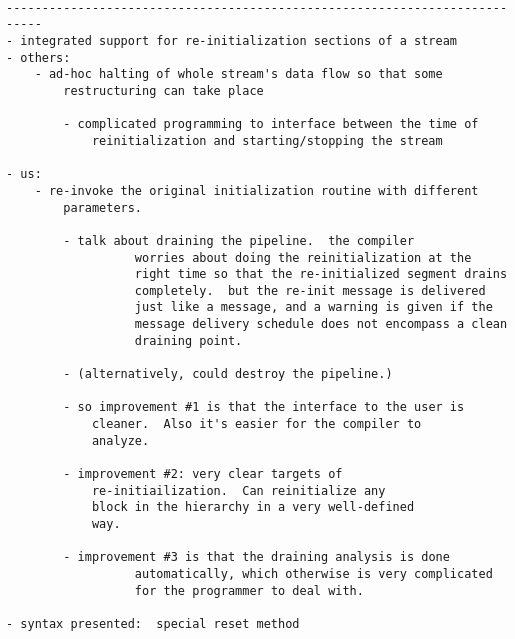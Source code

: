 \begin{verbatim}

---------------------------------------------------------------------------
- integrated support for re-initialization sections of a stream
- others:	
	- ad-hoc halting of whole stream's data flow so that some
		restructuring can take place
		
		- complicated programming to interface between the time of
			reinitialization and starting/stopping the stream

- us:
	- re-invoke the original initialization routine with different 
		parameters.

		- talk about draining the pipeline.  the compiler
                  worries about doing the reinitialization at the
                  right time so that the re-initialized segment drains
                  completely.  but the re-init message is delivered
                  just like a message, and a warning is given if the
                  message delivery schedule does not encompass a clean
                  draining point.

		- (alternatively, could destroy the pipeline.)

		- so improvement #1 is that the interface to the user is 
			cleaner.  Also it's easier for the compiler to 
			analyze.

		- improvement #2: very clear targets of
			re-initiailization.  Can reinitialize any
			block in the hierarchy in a very well-defined
			way.

		- improvement #3 is that the draining analysis is done
                  automatically, which otherwise is very complicated
                  for the programmer to deal with.

- syntax presented:  special reset method

\end{verbatim}






